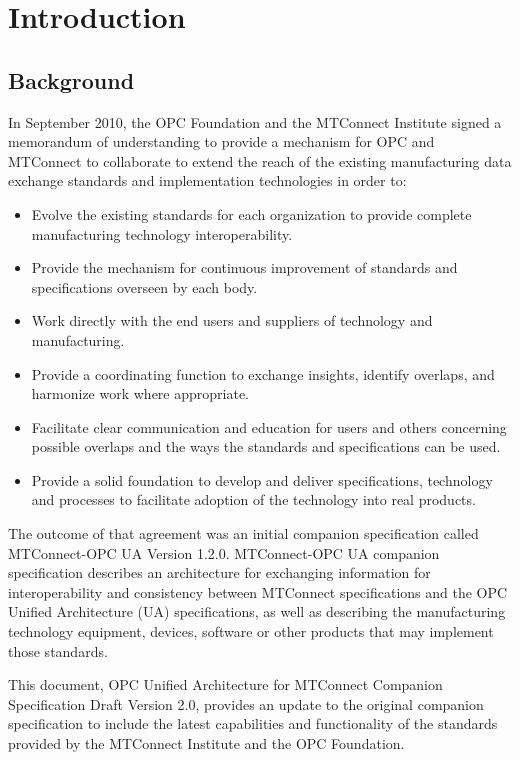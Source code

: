 \section{Introduction}\label{intro}

\subsection{Background}

In September 2010, the OPC Foundation and the MTConnect Institute signed a memorandum of understanding to provide a mechanism for OPC and MTConnect to collaborate to extend the reach of the existing manufacturing data exchange standards and implementation technologies in order to:

\begin{itemize}
    \item Evolve the existing standards for each organization to provide complete manufacturing technology interoperability.
    \item Provide the mechanism for continuous improvement of standards and specifications overseen by each body.
    \item Work directly with the end users and suppliers of technology and manufacturing. 
    \item Provide a coordinating function to exchange insights, identify overlaps, and harmonize work where appropriate.
    \item Facilitate clear communication and education for users and others concerning possible overlaps and the ways the standards and specifications can be used.
    \item Provide a solid foundation to develop and deliver specifications, technology and processes to facilitate adoption of the technology into real products.
\end{itemize}

The outcome of that agreement was an initial companion specification called MTConnect-OPC UA Version 1.2.0. MTConnect-OPC UA companion specification describes an architecture for exchanging information for interoperability and consistency between MTConnect specifications and the OPC Unified Architecture (UA) specifications, as well as describing the manufacturing technology equipment, devices, software or other products that may implement those standards.

This document, OPC Unified Architecture for MTConnect Companion Specification Draft Version 2.0, provides an update to the original companion specification to include the latest capabilities and functionality of the standards provided by the MTConnect Institute and the OPC Foundation.

